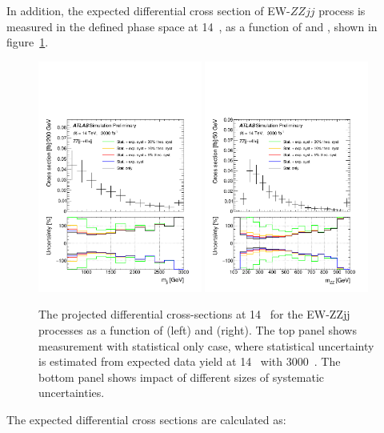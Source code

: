 In addition, the expected differential cross section of EW-$ZZjj$ process is measured in the defined phase space at 14~\tev,
as a function of \mzz and \mjj, shown in figure~\ref{fig:xs_mjj_mzz}.
\begin{figure}[!htbp]
\centering
\includegraphics[width=0.48\textwidth]{figures/VBSZZ/hllhc/TagJJM_final_all_linear.pdf}
\includegraphics[width=0.48\textwidth]{figures/VBSZZ/hllhc/MZZ_all_linear.pdf}
\caption{
The projected differential cross-sections at 14~\TeV{} for the EW-ZZjj processes as a function of \mjj (left) and \mzz (right).
The top panel shows measurement with statistical only case,
where statistical uncertainty is estimated from expected data yield at 14~\TeV{} with 3000~\ifb.
The bottom panel shows impact of different sizes of systematic uncertainties.
}
\label{fig:xs_mjj_mzz}
\end{figure}
The expected differential cross sections are calculated as:
